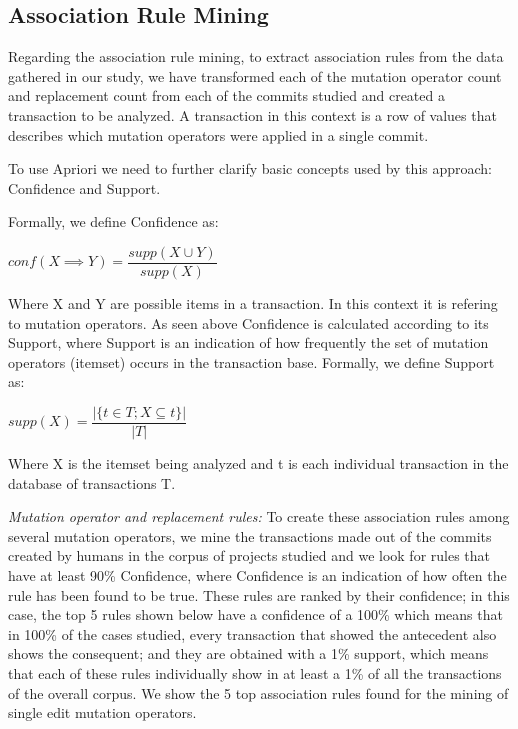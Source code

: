 \documentclass[conference]{IEEEtran}
\begin{document}

\subsection{Association Rule Mining} \label{armRes}
Regarding the association rule mining, to extract association rules from the data gathered in our study, we 
have transformed each of the mutation operator count and replacement count from 
each of the commits studied and created a transaction to be analyzed. A transaction in this context is a row of values that describes which mutation operators were applied in a single commit.

To use Apriori we need to further clarify basic concepts used by this approach: Confidence and Support.

Formally, we define Confidence as:

\begin{center}
$conf(X \implies Y) = \dfrac{supp(X \cup Y)}{supp(X)}$ 
\end{center}

Where X and Y are possible items in a transaction. In this context it is refering to mutation operators. As seen above Confidence is calculated according to its Support, where Support is an indication of how frequently the set of mutation operators (itemset) occurs in the transaction base.
Formally, we define Support as:

\begin{center}
$supp(X) = \dfrac{|\{t \in T; X \subseteq t\}|}{|T|}$
\end{center}

Where X is the itemset being analyzed and t is each individual transaction in the database of transactions T. 

\emph{Mutation operator and replacement rules:}
To create these association rules among several mutation operators, we mine the
transactions made out of the commits created by humans in the corpus of projects
studied and we look for rules that have at least 90\% Confidence, where
Confidence is an indication of how often the rule has been found to be true.  
These rules are ranked by their confidence; in this case, the top 5 rules shown
below have a confidence of a 100\% which means that in 100\% of the cases
studied, every transaction that showed the antecedent also shows the consequent;
and they are obtained with a 1\% support, which means that each of these rules
individually show in at least a 1\% of all the transactions of the overall
corpus. We show the 5  top association rules found for the mining of single edit
mutation operators. 
\end{document}
